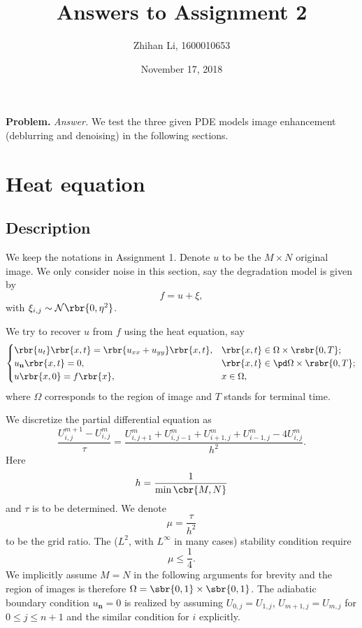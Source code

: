 \documentclass[english, nochinese]{pnote}
\title{Answers to Assignment 2}
\author{Zhihan Li, 1600010653}
\date{November 17, 2018}
\begin{document}
\maketitle

\textbf{Problem.} \textit{Answer.} We test the three given PDE models image enhancement
(deblurring and denoising) in the following sections. 

\section{Heat equation}

\subsection{Description}

We keep the notations in Assignment 1. Denote $u$ to be the $ M \times N $ original image. We only consider noise in this section, say the degradation model is given by
\begin{equation}
f = u + \xi,
\end{equation}
with $ \xi_{ i, j } \sim \mathcal{N} \rbr{ 0, \eta^2 } $.

We try to recover $u$ from $f$ using the heat equation, say
\begin{equation}
\begin{cases}
\rbr{u_t} \rbr{ x, t } = \rbr{ u_{ x x } + u_{ y y } } \rbr{ x, t }, & \rbr{ x, t } \in \Omega \times \rsbr{ 0, T }; \\
u_{\mathbf{n}} \rbr{ x, t } = 0, & \rbr{ x, t } \in \pd \Omega \times \rsbr{ 0, T }; \\
u \rbr{ x, 0 } = f \rbr{x}, & x \in \Omega,
\end{cases}
\end{equation}
where $\Omega$ corresponds to the region of image and $T$ stands for terminal time.

We discretize the partial differential equation as
\begin{equation} \label{Eq:DisHeat}
\frac{ U_{ i, j }^{ m + 1 } - U_{ i, j }^m }{\tau} = \frac{ U_{ i, j + 1 }^m + U_{ i, j - 1 }^m + U_{ i + 1, j }^m + U_{ i - 1, j }^m - 4 U_{ i, j }^m }{h^2}.
\end{equation}
Here 
\begin{equation}
h = \frac{1}{ \min \cbr{ M, N } }
\end{equation}
and $\tau$ is to be determined. We denote
\begin{equation}
\mu = \frac{\tau}{h^2}
\end{equation}
to be the grid ratio. The ($L^2$, with $L^{\infty}$ in many cases) stability condition require
\begin{equation}
\mu \le \frac{1}{4}.
\end{equation}
We implicitly assume $ M = N $ in the following arguments for brevity and the region of images is therefore $ \Omega = \sbr{ 0, 1 } \times \sbr{ 0, 1 } $. The adiabatic boundary condition $ u_{\mathbf{n}} = 0 $ is realized by assuming $ U_{ 0, j } = U_{ 1, j } $, $ U_{ m + 1, j } = U_{ m, j } $ for $ 0 \le j \le n + 1 $ and the similar condition for $i$ explicitly.
\end{document}
